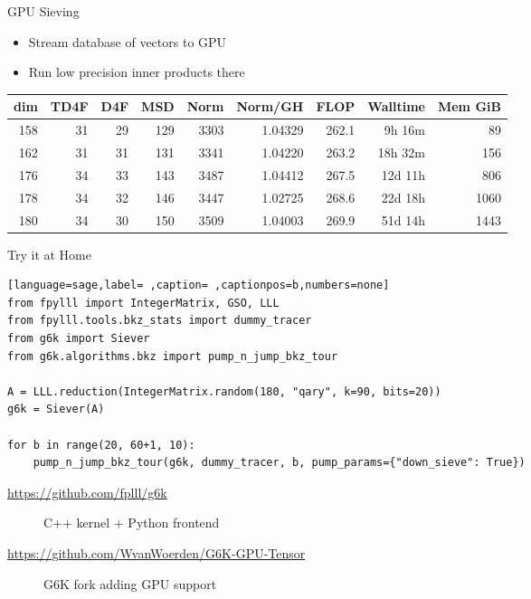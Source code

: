 \documentclass[table,10pt,aspectratio=169]{beamer}
\begin{document}
\begin{frame}[label={sec:org6f2c295}]{GPU Sieving}
\begin{itemize}
\item Stream database of vectors to GPU
\item Run low precision inner products there
\end{itemize}

\begin{center}
\begin{tabular}{rrrrrrrrr}
\toprule
dim & TD4F & D4F & MSD & Norm & Norm/GH & FLOP & Walltime & Mem GiB\\[0pt]
\midrule
158 & 31 & 29 & 129 & 3303 & 1.04329 & 262.1 & 9h 16m & 89\\[0pt]
162 & 31 & 31 & 131 & 3341 & 1.04220 & 263.2 & 18h 32m & 156\\[0pt]
176 & 34 & 33 & 143 & 3487 & 1.04412 & 267.5 & 12d 11h & 806\\[0pt]
178 & 34 & 32 & 146 & 3447 & 1.02725 & 268.6 & 22d 18h & 1060\\[0pt]
180 & 34 & 30 & 150 & 3509 & 1.04003 & 269.9 & 51d 14h & 1443\\[0pt]
\bottomrule
\end{tabular}

\end{center}

\scriptsize

\end{frame}

\begin{frame}[label={sec:org3dd5df9},fragile]{Try it at Home}
 \begin{lstlisting}[language=sage,label= ,caption= ,captionpos=b,numbers=none]
from fpylll import IntegerMatrix, GSO, LLL
from fpylll.tools.bkz_stats import dummy_tracer
from g6k import Siever
from g6k.algorithms.bkz import pump_n_jump_bkz_tour

A = LLL.reduction(IntegerMatrix.random(180, "qary", k=90, bits=20))
g6k = Siever(A)

for b in range(20, 60+1, 10):
    pump_n_jump_bkz_tour(g6k, dummy_tracer, b, pump_params={"down_sieve": True})
\end{lstlisting}

\begin{description}
\item[{\url{https://github.com/fplll/g6k}}] C++ kernel + Python frontend
\item[{\url{https://github.com/WvanWoerden/G6K-GPU-Tensor}}] G6K fork adding GPU support
\end{description}
\end{frame}
\end{document}

